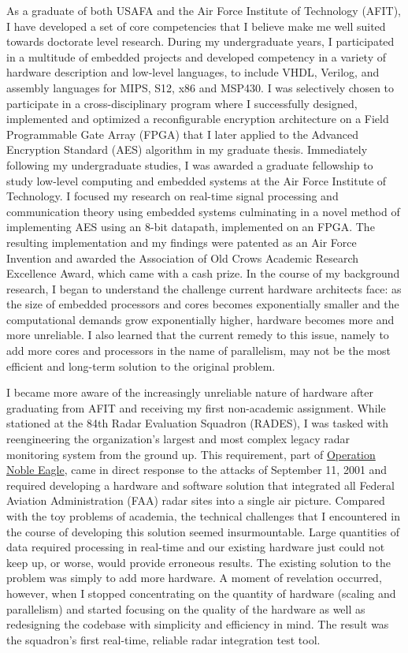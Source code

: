 \documentclass{article}
\begin{document}
As a graduate of both USAFA and the Air Force Institute of Technology
(AFIT), I have developed a set of core competencies that I believe make me well
suited towards doctorate level research. During my undergraduate years, I
participated in a multitude of embedded projects and developed competency in a
variety of hardware description and low-level languages, to include VHDL,
Verilog, and assembly languages for MIPS, S12, x86 and MSP430. I was
selectively chosen to participate in a cross-disciplinary
program where I successfully designed, implemented and optimized a
reconfigurable encryption architecture on a Field Programmable Gate Array
(FPGA) that I later applied to the Advanced Encryption Standard (AES) algorithm
in my graduate thesis. Immediately following my undergraduate studies, I was
awarded a graduate fellowship to study low-level computing and embedded systems
at the Air Force Institute of Technology. I focused my research on real-time
signal processing and communication theory using embedded systems culminating
in a novel method of implementing AES using an 8-bit datapath, implemented on
an FPGA. The resulting implementation and my findings were patented as an Air Force
Invention and awarded the Association of Old Crows Academic Research Excellence
Award, which came with a cash prize. In the course of my background research, I
began to understand the challenge current hardware architects face: as the size
of embedded processors and cores becomes exponentially smaller and the
computational demands grow exponentially higher, hardware becomes more and more
unreliable. I also learned that the current remedy to this issue, namely to add
more cores and processors in the name of parallelism, may not be the most
efficient and long-term solution to the original problem.

I became more aware of the increasingly unreliable nature of hardware after
graduating from AFIT and receiving my first non-academic assignment. While
stationed at the 84th Radar Evaluation Squadron (RADES), I was tasked with
reengineering the organization's largest and most complex legacy radar
monitoring system from the ground up. This requirement, part of
\href{http://en.wikipedia.org/wiki/Operation_Noble_Eagle}{Operation Noble
Eagle}, came in direct response to the attacks of September 11, 2001 and
required developing a hardware and software solution that integrated all
Federal Aviation Administration (FAA) radar sites into a single air picture.
Compared with the toy problems of academia, the technical challenges that I
encountered in the course of developing this solution seemed insurmountable.
Large quantities of data required processing in real-time and our existing
hardware just could not keep up, or worse, would provide erroneous results. The
existing solution to the problem was simply to add more hardware. A moment of
revelation occurred, however, when I
stopped concentrating on the quantity of hardware (scaling and parallelism) and
started focusing on the quality of the hardware as well as redesigning the
codebase with simplicity and efficiency in mind. The result was the squadron's
first real-time, reliable radar integration test tool.
\end{document}
